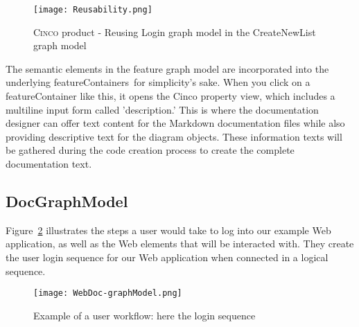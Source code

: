 \begin{figure}[h]
    \centering
    \texttt{[image: Reusability.png]}
    \caption{\textsc{Cinco} product - Reusing Login graph model in the CreateNewList graph model}
    \label{fig:reusability}
\end{figure}

The semantic elements in the feature graph model are incorporated into the underlying featureContainers for simplicity's sake. When you click on a featureContainer like this, it opens the Cinco property view, which includes a multiline input form called 'description.' This is where the documentation designer can offer text content for the Markdown documentation files while also providing descriptive text for the diagram objects. These information texts will be gathered during the code creation process to create the complete documentation text.

\subsection{DocGraphModel}\label{sec:DocGrahpModElem}

Figure~\ref{fig:loginSeq} illustrates the steps a user would take to log into our example Web application, as well as the Web elements that will be interacted with. They create the user login sequence for our Web application when connected in a logical sequence.

\begin{figure}[h]
    \centering
    \texttt{[image: WebDoc-graphModel.png]}
    \caption{Example of a user workflow: here the login sequence}
    \label{fig:loginSeq}
\end{figure}

